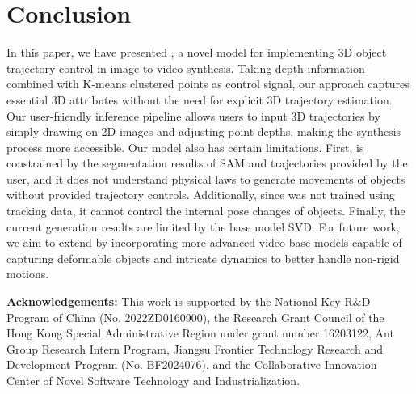 \section{Conclusion}\label{sec:conclusion}
In this paper, we have presented \method, a novel model for implementing 3D object trajectory control in image-to-video synthesis.
Taking depth information combined with K-means clustered points as control signal, our approach captures essential 3D attributes without the need for explicit 3D trajectory estimation. Our user-friendly inference pipeline allows users to input 3D trajectories by simply drawing on 2D images and adjusting point depths, making the synthesis process more accessible. Our model also has certain limitations. First, \method is constrained by the segmentation results of SAM and trajectories provided by the user, and it does not understand physical laws to generate movements of objects without provided trajectory controls. Additionally, since \method was not trained using tracking data, it cannot control the internal pose changes of objects. Finally, the current generation results are limited by the base model SVD. For future work, we aim to extend \method by incorporating more advanced video base models capable of capturing deformable objects and intricate dynamics to better handle non-rigid motions.

\noindent\textbf{Acknowledgements:} This work is supported by the National Key R$\&$D Program of China (No. 2022ZD0160900), the Research Grant Council of the Hong Kong Special Administrative Region under grant number 16203122, Ant Group Research Intern Program, Jiangsu Frontier Technology Research and Development Program (No. BF2024076), and the Collaborative Innovation Center of Novel Software Technology and Industrialization.